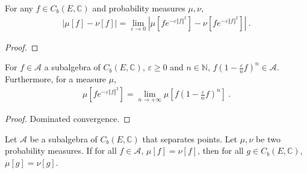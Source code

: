 \begin{lemma}\label{lem:introduce_exponential}
For any $f \in C_b(E, \mathbb{C})$ and probability measures $\mu, \nu$,
\begin{align*}
\left\vert \mu[f] - \nu[f] \right\vert
= \lim_{\varepsilon \to 0} \left\vert \mu\left[f e^{-\varepsilon \Vert f \Vert^2} \right] - \nu\left[f e^{-\varepsilon \Vert f \Vert^2} \right] \right\vert
\: .
\end{align*}
\end{lemma}

\begin{proof}
\end{proof}

\begin{lemma}\label{lem:exponiential_M_eq_limit_M}
For $f \in \mathcal A$ a subalgebra of $C_b(E, \mathbb{C})$, $\varepsilon \ge 0$ and $n \in \mathbb{N}$, $f (1 - \frac{\varepsilon}{n} f)^n \in \mathcal A$. Furthermore, for a measure $\mu$,
\begin{align*}
\mu\left[f e^{-\varepsilon \Vert f \Vert^2}\right] = \lim_{n \to + \infty} \mu\left[f (1 - \frac{\varepsilon}{n} f)^n\right] \: .
\end{align*}
\end{lemma}

\begin{proof}
Dominated convergence.
\end{proof}

\begin{lemma}\label{lem:Cb_eq_of_separating}
Let $\mathcal A$ be a subalgebra of $C_b(E, \mathbb{C})$ that separates points. Let $\mu, \nu$ be two probability measures. If for all $f \in \mathcal A$, $\mu[f] = \nu[f]$, then for all $g \in C_b(E, \mathbb{C})$, $\mu[g] = \nu[g]$.
\end{lemma}

